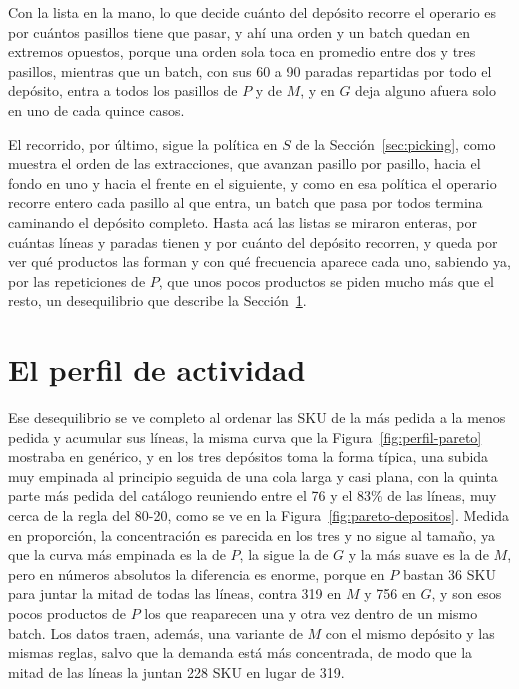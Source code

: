 Con la lista en la mano, lo que decide cuánto del depósito recorre el operario es por cuántos pasillos tiene que pasar, y ahí una orden y un batch quedan en extremos opuestos, porque una orden sola toca en promedio entre dos y tres pasillos, mientras que un batch, con sus 60 a 90 paradas repartidas por todo el depósito, entra a todos los pasillos de $P$ y de $M$, y en $G$ deja alguno afuera solo en uno de cada quince casos.

El recorrido, por último, sigue la política en $S$ de la Sección~\ref{sec:picking}, como muestra el orden de las extracciones, que avanzan pasillo por pasillo, hacia el fondo en uno y hacia el frente en el siguiente, y como en esa política el operario recorre entero cada pasillo al que entra, un batch que pasa por todos termina caminando el depósito completo.
Hasta acá las listas se miraron enteras, por cuántas líneas y paradas tienen y por cuánto del depósito recorren, y queda por ver qué productos las forman y con qué frecuencia aparece cada uno, sabiendo ya, por las repeticiones de $P$, que unos pocos productos se piden mucho más que el resto, un desequilibrio que describe la Sección~\ref{sec:perfil-deposito}.

\section{El perfil de actividad}
\label{sec:perfil-deposito}

Ese desequilibrio se ve completo al ordenar las SKU de la más pedida a la menos pedida y acumular sus líneas, la misma curva que la Figura~\ref{fig:perfil-pareto} mostraba en genérico, y en los tres depósitos toma la forma típica, una subida muy empinada al principio seguida de una cola larga y casi plana, con la quinta parte más pedida del catálogo reuniendo entre el 76 y el 83\% de las líneas, muy cerca de la regla del 80-20, como se ve en la Figura~\ref{fig:pareto-depositos}.
Medida en proporción, la concentración es parecida en los tres y no sigue al tamaño, ya que la curva más empinada es la de $P$, la sigue la de $G$ y la más suave es la de $M$, pero en números absolutos la diferencia es enorme, porque en $P$ bastan 36 SKU para juntar la mitad de todas las líneas, contra 319 en $M$ y 756 en $G$, y son esos pocos productos de $P$ los que reaparecen una y otra vez dentro de un mismo batch.
Los datos traen, además, una variante de $M$ con el mismo depósito y las mismas reglas, salvo que la demanda está más concentrada, de modo que la mitad de las líneas la juntan 228 SKU en lugar de 319.

